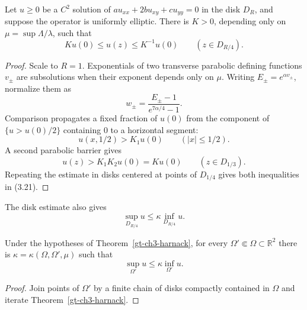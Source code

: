 \begin{theorem}\label{gt-ch3-harnack}
Let $u\geq0$ be a $C^2$ solution of
$au_{xx}+2bu_{xy}+cu_{yy}=0$ in the disk $D_R$, and suppose the operator is
uniformly elliptic. There is $K>0$, depending only on
$\mu=\sup\Lambda/\lambda$, such that
\begin{equation}
\tag{3.21}
Ku(0)\leq u(z)\leq K^{-1}u(0)\qquad(z\in D_{R/4}).
\end{equation}
\end{theorem}
\begin{proof}
\sketch Scale to $R=1$. Exponentials of two transverse parabolic defining
functions $v_\pm$ are subsolutions when their exponent depends only on $\mu$.
Writing $E_\pm=e^{\alpha v_\pm}$, normalize them as
\begin{equation}
\tag{3.22}
w_\pm=\frac{E_\pm-1}{e^{7\alpha/4}-1}.
\end{equation}
Comparison propagates a fixed fraction of $u(0)$ from the component of
$\{u>u(0)/2\}$ containing $0$ to a horizontal segment:
\begin{equation}
\tag{3.23}
u(x,1/2)>K_1u(0)\qquad(|x|\leq1/2).
\end{equation}
A second parabolic barrier gives
\begin{equation}
\tag{3.24}
u(z)>K_1K_2u(0)=Ku(0)\qquad(z\in D_{1/3}).
\end{equation}
Repeating the estimate in disks centered
at points of $D_{1/4}$ gives both inequalities in (3.21).
\end{proof}

The disk estimate also gives
\begin{equation}
\tag{3.25}
\sup_{D_{R/4}}u\leq\kappa\inf_{D_{R/4}}u.
\end{equation}

\begin{corollary}\label{gt-ch3-harnack-cor}
Under the hypotheses of Theorem~\ref{gt-ch3-harnack}, for every
$\Omega'\Subset\Omega\subset\mathbb R^2$ there is
$\kappa=\kappa(\Omega,\Omega',\mu)$ such that
\begin{equation}
\tag{3.26}
\sup_{\Omega'}u\leq\kappa\inf_{\Omega'}u.
\end{equation}
\end{corollary}
\begin{proof}
\sketch Join points of $\Omega'$ by a finite chain of disks compactly
contained in $\Omega$ and iterate Theorem~\ref{gt-ch3-harnack}.
\end{proof}

